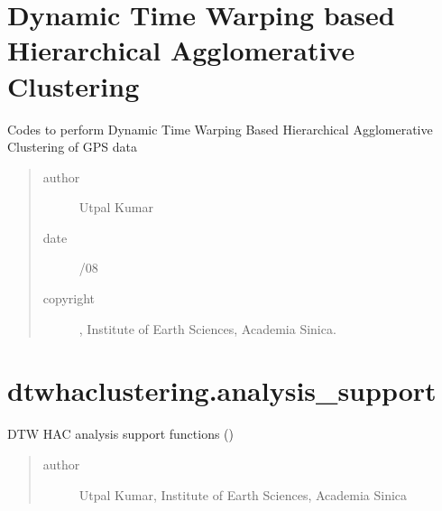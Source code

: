 \documentclass[letterpaper,10pt,english]{sphinxmanual}
\begin{document}
\chapter{Dynamic Time Warping based Hierarchical Agglomerative Clustering}
\label{\detokenize{modules/module_contents:dynamic-time-warping-based-hierarchical-agglomerative-clustering}}\label{\detokenize{modules/module_contents::doc}}
\sphinxAtStartPar
Codes to perform Dynamic Time Warping Based Hierarchical Agglomerative Clustering of GPS data
\begin{quote}\begin{description}
\item[{author}] \leavevmode
\sphinxAtStartPar
Utpal Kumar

\item[{date}] \leavevmode
{}/08

\item[{copyright}] \leavevmode
{}, Institute of Earth Sciences, Academia Sinica.

\end{description}\end{quote}


\chapter{dtwhaclustering.analysis\_support}
\label{\detokenize{modules/analysis_support:module-dtwhaclustering.analysis_support}}\label{\detokenize{modules/analysis_support:dtwhaclustering-analysis-support}}\label{\detokenize{modules/analysis_support::doc}}
\sphinxAtStartPar
DTW HAC analysis support functions ()
\begin{quote}\begin{description}
\item[{author}] \leavevmode
\sphinxAtStartPar
Utpal Kumar, Institute of Earth Sciences, Academia Sinica

\end{description}\end{quote}
\end{document}
